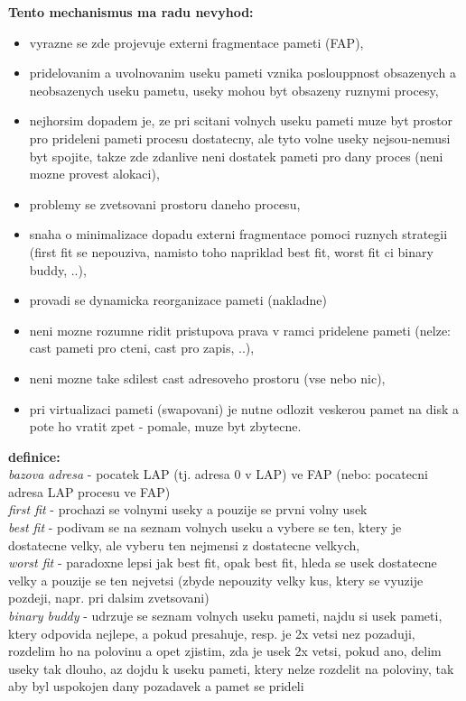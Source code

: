 \documentclass[a4paper, 11pt]{article}
\begin{document}
\textbf{Tento mechanismus ma radu nevyhod:}
\begin{itemize}
    \item vyrazne se zde projevuje externi fragmentace pameti (FAP),
    \item pridelovanim a uvolnovanim useku pameti vznika poslouppnost obsazenych a neobsazenych useku pametu, useky mohou byt obsazeny ruznymi procesy,
    \item nejhorsim dopadem je, ze pri scitani volnych useku pameti muze byt prostor pro prideleni pameti procesu dostatecny, ale tyto volne useky nejsou-nemusi byt spojite, takze zde zdanlive neni dostatek pameti pro dany proces (neni mozne provest alokaci),
    \item problemy se zvetsovani prostoru daneho procesu,
    \item snaha o minimalizace dopadu externi fragmentace pomoci ruznych strategii (first fit se nepouziva, namisto toho napriklad best fit, worst fit ci binary buddy, ..),
    \item provadi se dynamicka reorganizace pameti (nakladne)
    \item neni mozne rozumne ridit pristupova prava v ramci pridelene pameti (nelze: cast pameti pro cteni, cast pro zapis, ..),
    \item neni mozne take sdilest cast adresoveho prostoru (vse nebo nic),
    \item pri virtualizaci pameti (swapovani) je nutne odlozit veskerou pamet na disk a pote ho vratit zpet - pomale, muze byt zbytecne. \\
\end{itemize}

\textbf{definice:} \\[0.5em]
\textit{bazova adresa} - pocatek LAP (tj. adresa 0 v LAP) ve FAP (nebo: pocatecni adresa LAP procesu ve FAP) \\[0.2em]
\textit{first fit} - prochazi se volnymi useky a pouzije se prvni volny usek \\[0.2em]
\textit{best fit} - podivam se na seznam volnych useku a vybere se ten, ktery je dostatecne velky, ale vyberu ten nejmensi z dostatecne velkych, \\[0.2em]
\textit{worst fit} - paradoxne lepsi jak best fit, opak best fit, hleda se usek dostatecne velky a pouzije se ten nejvetsi (zbyde nepouzity velky kus, ktery se vyuzije pozdeji, napr. pri dalsim zvetsovani) \\[0.2em]
\textit{binary buddy} - udrzuje se seznam volnych useku pameti, najdu si usek pameti, ktery odpovida nejlepe, a pokud presahuje, resp. je 2x vetsi nez pozaduji, rozdelim ho na polovinu a opet zjistim, zda je usek 2x vetsi, pokud ano, delim useky tak dlouho, az dojdu k useku pameti, ktery nelze rozdelit na poloviny, tak aby byl uspokojen dany pozadavek a pamet se prideli \\[0.2em]
\end{document}
